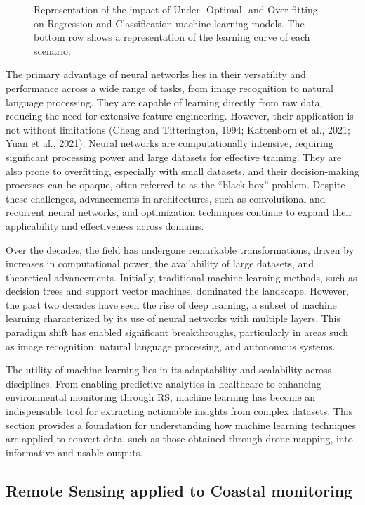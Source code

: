 \documentclass[
  letterpaper,
  11pt,
  english,
  singlespacing,
  headsepline]{MastersDoctoralThesis}
\begin{document}
\begin{spacing}{1.5}
\begin{figure}
{}

\caption{\label{fig-learningRates}Representation of the impact of Under-
Optimal- and Over-fitting on Regression and Classification machine
learning models. The bottom row shows a representation of the learning
curve of each scenario.}

\end{figure}%

The primary advantage of neural networks lies in their versatility and
performance across a wide range of tasks, from image recognition to
natural language processing. They are capable of learning directly from
raw data, reducing the need for extensive feature engineering. However,
their application is not without limitations (Cheng and Titterington,
1994; Kattenborn et al., 2021; Yuan et al., 2021). Neural networks are
computationally intensive, requiring significant processing power and
large datasets for effective training. They are also prone to
overfitting, especially with small datasets, and their decision-making
processes can be opaque, often referred to as the ``black box'' problem.
Despite these challenges, advancements in architectures, such as
convolutional and recurrent neural networks, and optimization techniques
continue to expand their applicability and effectiveness across domains.

Over the decades, the field has undergone remarkable transformations,
driven by increases in computational power, the availability of large
datasets, and theoretical advancements. Initially, traditional machine
learning methods, such as decision trees and support vector machines,
dominated the landscape. However, the past two decades have seen the
rise of deep learning, a subset of machine learning characterized by its
use of neural networks with multiple layers. This paradigm shift has
enabled significant breakthroughs, particularly in areas such as image
recognition, natural language processing, and autonomous systems.

The utility of machine learning lies in its adaptability and scalability
across disciplines. From enabling predictive analytics in healthcare to
enhancing environmental monitoring through RS, machine learning has
become an indispensable tool for extracting actionable insights from
complex datasets. This section provides a foundation for understanding
how machine learning techniques are applied to convert data, such as
those obtained through drone mapping, into informative and usable
outputs.

\subsection{Remote Sensing applied to Coastal
monitoring}\label{remote-sensing-applied-to-coastal-monitoring}


\end{spacing}
\end{document}

